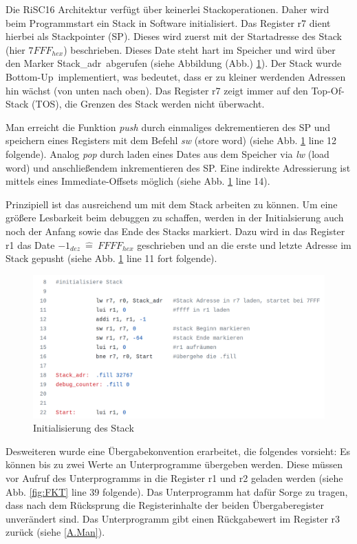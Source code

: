 \documentclass[fleqn, a4paper, 11pt]{article}       %
\begin{document}
Die RiSC16 Architektur verfügt über keinerlei Stackoperationen. Daher wird beim Programmstart ein Stack in Software initialisiert. Das Register r7 dient hierbei als Stackpointer (SP). Dieses wird zuerst mit der Startadresse des Stack (hier $7FFF_{hex}$) beschrieben. Dieses Date steht hart im Speicher und wird über den Marker \glqq Stack\_adr\grqq \ abgerufen (siehe  Abbildung (Abb.) \ref{fig:Stack}).
Der Stack wurde  \glqq Bottom-Up\grqq \ implementiert, was bedeutet, dass er zu kleiner werdenden Adressen hin wächst (von unten nach oben). Das Register r7 zeigt immer auf den Top-Of-Stack (TOS), die Grenzen des Stack werden nicht überwacht.

Man erreicht die Funktion \emph{push}  durch einmaliges dekrementieren des SP und speichern eines Registers mit dem Befehl \emph{sw} (store word) (siehe Abb. \ref{fig:Stack} line 12 folgende). Analog \emph{pop} durch laden eines Dates aus dem Speicher via \emph{lw} (load word) und anschließendem inkrementieren des SP. Eine indirekte Adressierung ist mittels eines Immediate-Offsets möglich (siehe Abb. \ref{fig:Stack} line 14).

Prinzipiell ist das ausreichend um mit dem Stack arbeiten zu können. Um eine größere Lesbarkeit beim debuggen zu schaffen, werden in der Initialsierung auch noch der Anfang sowie das Ende des Stacks markiert. Dazu wird in das Register r1 das Date $-1_{dez}\ \widehat{=}\ FFFF_{hex}$ geschrieben und an die erste und letzte Adresse im Stack gepusht (siehe Abb. \ref{fig:Stack} line 11 fort folgende).

\begin{figure}[h]
    \includegraphics[width =1\textwidth]{Stack_init.png}
\caption{Initialisierung des Stack}
\label{fig:Stack}
\end{figure}

Desweiteren wurde eine Übergabekonvention erarbeitet, die folgendes vorsieht: Es können bis zu zwei Werte an Unterprogramme übergeben werden. Diese müssen vor Aufruf des Unterprogramms in die Register r1 und r2 geladen werden (siehe Abb. \ref{fig:FKT} line 39 folgende). Das Unterprogramm hat dafür Sorge zu tragen, dass nach dem Rücksprung die Registerinhalte der beiden Übergaberegister unverändert sind. Das Unterprogramm gibt einen Rückgabewert im Register r3 zurück (siehe \ref{A.Man}).
\end{document}

